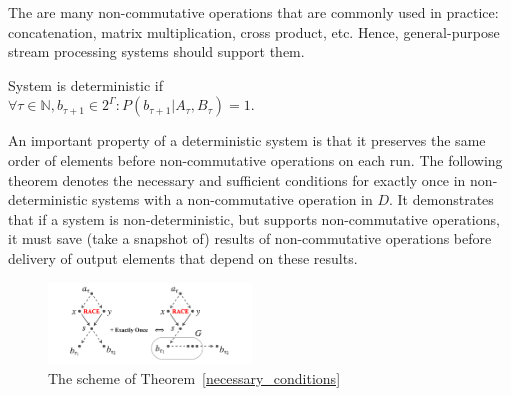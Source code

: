 The are many non-commutative operations that are commonly used in practice: concatenation, matrix multiplication, cross product,  etc. Hence, general-purpose stream processing systems should support them.

\begin{definition}{System is deterministic}
if\\ 
$\forall{\tau\in{\mathbb{N}}, b_{\tau+1}\in{2^{\Gamma}}}:P(b_{\tau+1}|A_{\tau},B_\tau)=1$.
\end{definition}

An important property of a deterministic system is that it preserves the same order of elements before non-commutative operations on each run. The following theorem denotes the necessary and sufficient conditions for exactly once in non-deterministic systems with a non-commutative operation in $D$. It demonstrates that if a system is non-deterministic, but supports non-commutative operations, it must save (take a snapshot of) results of non-commutative operations before delivery of output elements that depend on these results.

\begin{figure}[htbp]
  \centering
  \includegraphics[width=0.48\textwidth]{pics/theorem-pic}
  \caption{The scheme of Theorem~\ref{necessary_conditions}}
  \label {theorem-pic}
\end{figure}

